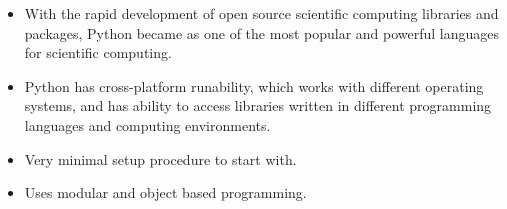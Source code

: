 \documentclass[landscape,a0paper,fontscale=0.22]{baposter} %
\newcommand{\compresslist}{ %
\setlength{\itemsep}{1pt}
\setlength{\parskip}{0pt}
\setlength{\parsep}{0pt}
}
\begin{document}
\begin{poster}
{\begin{itemize}
\item  With the rapid development of open source scientific computing libraries and packages, Python became as one of the most popular and powerful languages for scientific computing.

\item  Python has cross-platform runability, which works with different operating systems, and has ability to access libraries written in different programming languages and computing environments. 


\item  Very minimal setup procedure to start with. 

\item  Uses modular and object based programming.
\end{itemize}





}


%
%


\end{poster}
\end{document}
